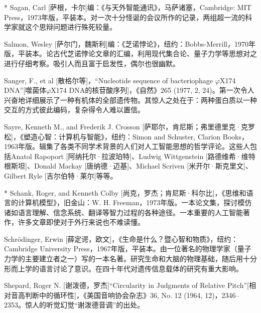 \begin{thebib}
\begin{biblist}
\item[*] Sagan, Carl [萨根，卡尔]编：《与天外智能通讯》，马萨诸塞，Cambridge: MIT Press，1973年版，平装本。对一次十分怪诞的会议所作的记录，两组超一流的科学家就这个思辩问题进行殊死较量。

\item Salmon, Wesley [萨尔门，魏斯利]编：《芝诺悖论》，纽约：Bobbs-Merrill，1970年版，平装本。论古代芝诺悖论文章的汇编，利用现代集合论、量子力学等思想对之进行仔细考察。吸引人而且富于启发性，偶尔也很幽默。

\item Sanger, F., et al [散格尔等]，“Nucleotide sequence of bacteriophage $\varphi$X174 DNA”[噬菌体$\varphi$X174 DNA的核苷酸序列]，《自然》265 (1977, 2, 24)。第一次令人兴奋地详细展示了一种有机体的全部遗传物。其惊人之处在于：两种蛋白质以一种交互的方式彼此编码，复杂得令人难以置信。

\item Sayre, Kenneth M., and Frederik J. Crosson [萨耶尔，肯尼斯；弗里德里克·克罗松]，《塑造心智：计算机与智能》，纽约：Simon and Schuster, Clarion Books，1963年版。辑集了各类不同学术背景的人们对人工智能思想的哲学评论。这些人包括Anatol Rapoport [阿纳托尔·拉波珀特]、Ludwig Wittgenstein [路德维希·维特根斯坦]、Donald Mackay [唐纳德·迈基]、Michael Scriven [米开尔·斯克里文]、Gilbert Ryle [吉尔伯特·莱尔]等等。

\item[*] Schank, Roger, and Kenneth Colby [尚克，罗杰；肯尼斯·科尔比]，《思维和语言的计算机模型》，旧金山：W. H. Freeman，1973年版。一本论文集，探讨模仿诸如语言理解、信念系统、翻译等智力过程的各种途径。一本重要的人工智能著作，许多文章即使对于外行来说也不难读懂。

\item Schrödinger, Erwin [薛定谔，欧文]，《生命是什么？暨心智和物质》，纽约：Cambridge University Press，1967年版，平装本。由一位著名的物理学家（量子力学的主要建立者之一）写的一本名著。研究生命和大脑的物理基础，随后用十分形而上学的语言讨论了意识。在四十年代对遗传信息载体的研究有重大影响。

\item Shepard, Roger N. [谢泼德，罗杰]“Circularity in Judgments of Relative Pitch”[相对音高判断中的循环性]，《美国音响协会杂志》36, No. 12 (1964, 12)，2346--2353。惊人的听觉幻觉“谢泼德音调”的出处。


\end{biblist}
\end{thebib}
